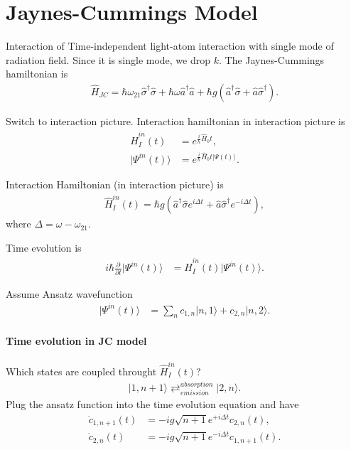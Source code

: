 \documentclass[../../note.tex]{subfiles}
\begin{document}
\section{Jaynes-Cummings Model} 
Interaction of Time-independent light-atom interaction with single mode of radiation field. Since it is single mode, we drop $k$. The Jaynes-Cummings hamiltonian is
\begin{align}
    \hat{H}_{JC} = \hbar \omega_{21} \hat{\sigma}^{\dagger} \hat{\sigma} + \hbar \omega \hat{a}^\dagger \hat{a} + \hbar g (\hat{a}^{\dagger}\hat{\sigma} + \hat{a}\hat{\sigma}^{\dagger}).
\end{align}

Switch to interaction picture. Interaction hamiltonian in interaction picture is 
\begin{align}
    \hat{H}^{in}_{I}(t) 
    &= e^{\frac{i}{\hbar} \hat{H}_0 t}, \\
    \vert \Psi^{in}(t) \rangle
    &= e^{\frac{i}{\hbar} \hat{H}_0 t \vert \Psi(t) \rangle}.
\end{align}

Interaction Hamiltonian (in interaction picture) is 
\begin{align}
    \hat{H}^{in}_I(t) = \hbar g \left( \hat{a}^{\dagger} \hat{\sigma} e^{i \Delta t} + \hat{a}\hat{\sigma}^{\dagger} e^{- i \Delta t} \right),
\end{align}
where $\Delta = \omega - \omega_{21}$.

Time evolution is 
\begin{align}
    i \hbar \frac{\partial}{\partial t} \vert \Psi^{in}(t) \rangle
    &= \hat{H}^{in}_I(t) \vert \Psi^{in}(t) \rangle.
\end{align}

Assume Ansatz wavefunction 
\begin{align}
    \vert \Psi^{in}(t) \rangle
    &= \sum_n c_{1, n} \vert n, 1 \rangle + c_{2, n} \vert n, 2 \rangle.
\end{align}

\paragraph*{Time evolution in JC model}
Which states are coupled throught $\hat{H}_I^{in}(t)$?
\begin{align}
    \vert 1, n+1 \rangle  \rightleftarrows_{emission}^{absorption} \vert 2, n \rangle.
\end{align}
Plug the ansatz function into the time evolution equation and have
\begin{align}
    \dot{c}_{1, n+1}(t) 
    &= -i g \sqrt{n+1} e^{+i \Delta t} c_{2, n}(t), \\
    \dot{c}_{2, n}(t) 
    &= -i g \sqrt{n+1} e^{-i \Delta t} c_{1, n+1}(t).
\end{align}
\end{document}
